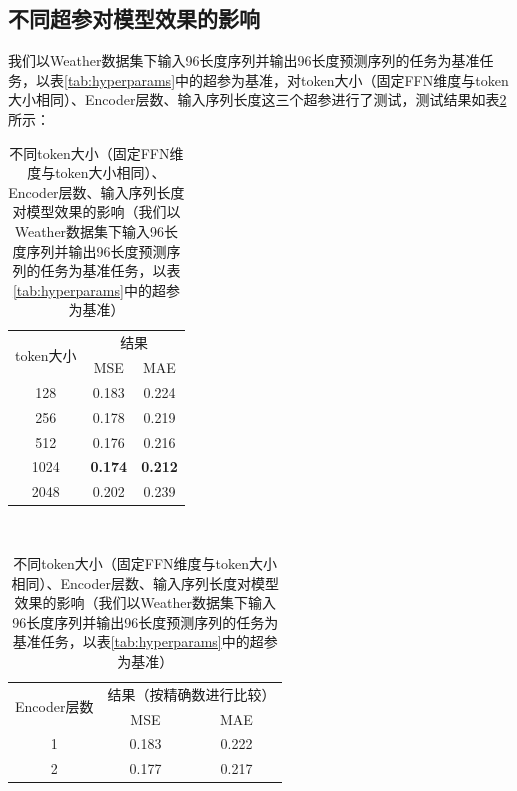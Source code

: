 \documentclass[twoside,12pt]{article}
\begin{document}
\subsection{不同超参对模型效果的影响}
我们以Weather数据集下输入96长度序列并输出96长度预测序列的任务为基准任务，以表\ref{tab:hyperparams}中的超参为基准，对token大小（固定FFN维度与token大小相同）、Encoder层数、输入序列长度这三个超参进行了测试，测试结果如表\ref{tab:hyperparams_test}所示：
\begin{table}[htbp]
  \caption{\small{不同token大小（固定FFN维度与token大小相同）、Encoder层数、输入序列长度对模型效果的影响（我们以Weather数据集下输入96长度序列并输出96长度预测序列的任务为基准任务，以表\ref{tab:hyperparams}中的超参为基准）}}
  \label{tab:hyperparams_test}
  \vspace{5pt}
  \centering
  \begin{tabular}{c|cc}
    \toprule
    \multirow{2}{*}{token大小} & \multicolumn{2}{c}{结果}                  \\
    \cmidrule(lr){2-3}
                               & MSE                      & MAE            \\
    \midrule
    128                        & 0.183                    & 0.224          \\
    256                        & 0.178                    & 0.219          \\
    512                        & 0.176                    & 0.216          \\
    1024                       & \textbf{0.174}           & \textbf{0.212} \\
    2048                       & 0.202                    & 0.239          \\
    \bottomrule
  \end{tabular}
  \\
  \vspace{5pt}
  \centering
  \begin{tabular}{c|cc}
    \toprule
    \multirow{2}{*}{Encoder层数} & \multicolumn{2}{c}{结果（按精确数进行比较）}                  \\
    \cmidrule(lr){2-3}
                                 & MSE                                          & MAE            \\
    \midrule
    1                            & 0.183                                        & 0.222          \\
    2                            & 0.177                                        & 0.217          \\

\end{tabular}
\end{table}
\end{document}

